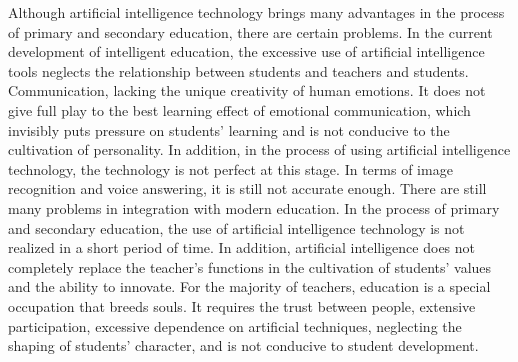 \documentclass[11pt,en,authoryear]{elegantpaper}
\begin{document}
Although artificial intelligence technology brings many advantages in the process of primary and secondary education, there are certain problems. In the current development of intelligent education, the excessive use of artificial intelligence tools neglects the relationship between students and teachers and students. Communication, lacking the unique creativity of human emotions. It does not give full play to the best learning effect of emotional communication, which invisibly puts pressure on students' learning and is not conducive to the cultivation of personality. In addition, in the process of using artificial intelligence technology, the technology is not perfect at this stage. In terms of image recognition and voice answering, it is still not accurate enough. There are still many problems in integration with modern education. In the process of primary and secondary education, the use of artificial intelligence technology is not realized in a short period of time. In addition, artificial intelligence does not completely replace the teacher's functions in the cultivation of students' values and the ability to innovate. For the majority of teachers, education is a special occupation that breeds souls. It requires the trust between people, extensive participation, excessive dependence on artificial techniques, neglecting the shaping of students' character, and is not conducive to student development.
\end{document}
